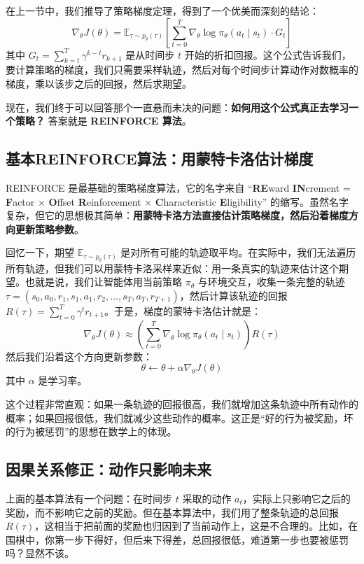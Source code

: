 \documentclass[lang=cn,zihao=-4,a4paper,fontset=windows]{beautybook}
\begin{document}
在上一节中，我们推导了策略梯度定理，得到了一个优美而深刻的结论：
\[
\nabla_\theta J(\theta) = \mathbb{E}_{\tau \sim p_\theta(\tau)} \left[ \sum_{t=0}^{T} \nabla_\theta \log \pi_\theta(a_t \mid s_t) \cdot G_t \right]
\]
其中 \(G_t = \sum_{k=t}^{T} \gamma^{k-t} r_{k+1}\) 是从时间步 \(t\) 开始的折扣回报。这个公式告诉我们，要计算策略的梯度，我们只需要采样轨迹，然后对每个时间步计算动作对数概率的梯度，乘以该步之后的回报，然后求期望。

现在，我们终于可以回答那个一直悬而未决的问题：\textbf{如何用这个公式真正去学习一个策略？} 答案就是 \textbf{REINFORCE 算法}。

\subsection{基本REINFORCE算法：用蒙特卡洛估计梯度}

REINFORCE 是最基础的策略梯度算法，它的名字来自 “\textbf{RE}ward \textbf{IN}crement = \textbf{F}actor × \textbf{O}ffset \textbf{R}einforcement × \textbf{C}haracteristic \textbf{E}ligibility” 的缩写。虽然名字复杂，但它的思想极其简单：\textbf{用蒙特卡洛方法直接估计策略梯度，然后沿着梯度方向更新策略参数}。

回忆一下，期望 \(\mathbb{E}_{\tau \sim p_\theta(\tau)}\) 是对所有可能的轨迹取平均。在实际中，我们无法遍历所有轨迹，但我们可以用蒙特卡洛采样来近似：用一条真实的轨迹来估计这个期望。也就是说，我们让智能体用当前策略 \(\pi_\theta\) 与环境交互，收集一条完整的轨迹 \(\tau = (s_0, a_0, r_1, s_1, a_1, r_2, \dots, s_T, a_T, r_{T+1})\)，然后计算该轨迹的回报 \(R(\tau) = \sum_{t=0}^{T} \gamma^t r_{t+1}\)。于是，梯度的蒙特卡洛估计就是：
\[
\nabla_\theta J(\theta) \approx \left( \sum_{t=0}^{T} \nabla_\theta \log \pi_\theta(a_t \mid s_t) \right) R(\tau)
\]
然后我们沿着这个方向更新参数：
\[
\theta \leftarrow \theta + \alpha \nabla_\theta J(\theta)
\]
其中 \(\alpha\) 是学习率。

这个过程非常直观：如果一条轨迹的回报很高，我们就增加这条轨迹中所有动作的概率；如果回报很低，我们就减少这些动作的概率。这正是“好的行为被奖励，坏的行为被惩罚”的思想在数学上的体现。

\subsection{因果关系修正：动作只影响未来}

上面的基本算法有一个问题：在时间步 \(t\) 采取的动作 \(a_t\)，实际上只影响它之后的奖励，而不影响它之前的奖励。但在基本算法中，我们用了整条轨迹的总回报 \(R(\tau)\)，这相当于把前面的奖励也归因到了当前动作上，这是不合理的。比如，在围棋中，你第一步下得好，但后来下得差，总回报很低，难道第一步也要被惩罚吗？显然不该。
\end{document}
